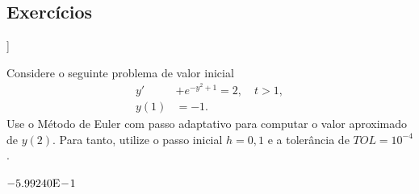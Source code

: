 \begin{ex}




 
      
  



\end{ex}

\subsection{Exercícios}

\begin{flushleft}
  [[tag:revisar]]
\end{flushleft}

\begin{exer}
  Considere o seguinte problema de valor inicial
  \begin{align}
    y' &+ e^{-y^2+1} = 2,\quad t>1,\\
    y(1) &= -1.
  \end{align}
Use o Método de Euler com passo adaptativo para computar o valor aproximado de $y(2)$. Para tanto, utilize o passo inicial $h=0,1$ e a tolerância de $TOL=10^{-4}$.
\end{exer}
\begin{resp}
  $-5.99240\mathrm{E}\!-\!1$
\end{resp}

